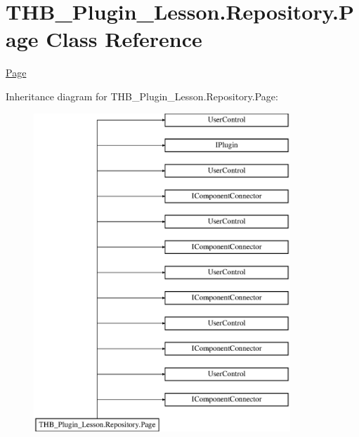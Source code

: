 \hypertarget{class_t_h_b___plugin___lesson_1_1_repository_1_1_page}{}\section{T\+H\+B\+\_\+\+Plugin\+\_\+\+Lesson.\+Repository.\+Page Class Reference}
\label{class_t_h_b___plugin___lesson_1_1_repository_1_1_page}


\mbox{\hyperlink{class_t_h_b___plugin___lesson_1_1_repository_1_1_page}{Page}}  


Inheritance diagram for T\+H\+B\+\_\+\+Plugin\+\_\+\+Lesson.\+Repository.\+Page\+:\begin{figure}[H]
\begin{center}
\leavevmode
\includegraphics[height=12.000000cm]{de/da5/class_t_h_b___plugin___lesson_1_1_repository_1_1_page}
\end{center}
\end{figure}
